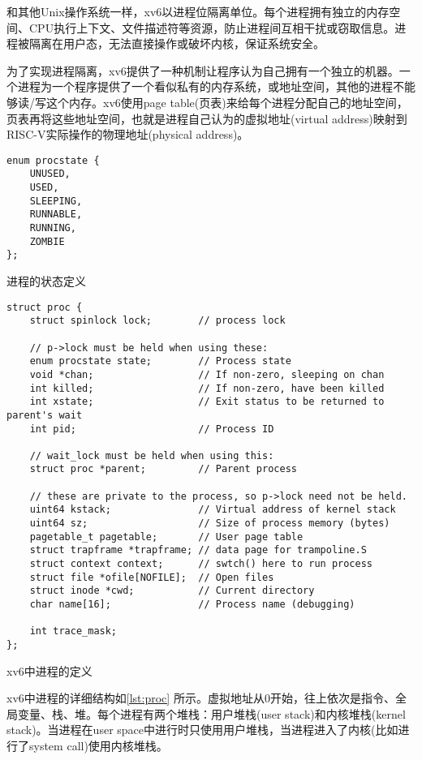 和其他Unix操作系统一样，xv6以进程位隔离单位。每个进程拥有独立的内存空间、CPU执行上下文、文件描述符等资源，防止进程间互相干扰或窃取信息。进程被隔离在用户态，无法直接操作或破坏内核，保证系统安全。

为了实现进程隔离，xv6提供了一种机制让程序认为自己拥有一个独立的机器。一个进程为一个程序提供了一个看似私有的内存系统，或地址空间，其他的进程不能够读/写这个内存。xv6使用page table(页表)来给每个进程分配自己的地址空间，页表再将这些地址空间，也就是进程自己认为的虚拟地址(virtual address)映射到RISC-V实际操作的物理地址(physical address)。

\begin{listing}[!htb]
	\begin{verbatim}
enum procstate {
    UNUSED, 
    USED, 
    SLEEPING, 
    RUNNABLE, 
    RUNNING, 
    ZOMBIE 
};
	\end{verbatim}
	\caption{进程的状态定义}\label{lst:procstate}
\end{listing}

\begin{listing}[!htb]
	\begin{verbatim}
struct proc {
    struct spinlock lock;        // process lock

    // p->lock must be held when using these:
    enum procstate state;        // Process state
    void *chan;                  // If non-zero, sleeping on chan
    int killed;                  // If non-zero, have been killed
    int xstate;                  // Exit status to be returned to parent's wait
    int pid;                     // Process ID

    // wait_lock must be held when using this:
    struct proc *parent;         // Parent process

    // these are private to the process, so p->lock need not be held.
    uint64 kstack;               // Virtual address of kernel stack
    uint64 sz;                   // Size of process memory (bytes)
    pagetable_t pagetable;       // User page table
    struct trapframe *trapframe; // data page for trampoline.S
    struct context context;      // swtch() here to run process
    struct file *ofile[NOFILE];  // Open files
    struct inode *cwd;           // Current directory
    char name[16];               // Process name (debugging)

    int trace_mask;
};
	\end{verbatim}
	\caption{xv6中进程的定义}\label{lst:proc}
\end{listing}

xv6中进程的详细结构如\cref{lst:proc} 所示。虚拟地址从0开始，往上依次是指令、全局变量、栈、堆。每个进程有两个堆栈：用户堆栈(user stack)和内核堆栈(kernel stack)。当进程在user space中进行时只使用用户堆栈，当进程进入了内核(比如进行了system call)使用内核堆栈。

